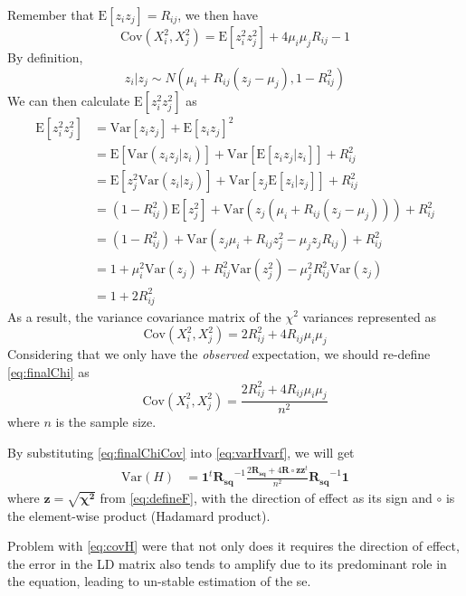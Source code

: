 			Remember that $\mathrm{E}[z_iz_j] = R_{ij}$, we then have
			$$
				\mathrm{Cov}(X_i^2, X_j^2)=\mathrm{E}[z_i^2z_j^2]+4\mu_i\mu_jR_{ij}-1
			$$
			By definition, 
			$$
				z_i|z_j\sim N(\mu_i+R_{ij}(z_j-\mu_j),1-R_{ij}^2)
			$$
			We can then calculate $\mathrm{E}[z_i^2z_j^2]$ as
			\begin{align*}
				\mathrm{E}[z_i^2z_j^2]&=\mathrm{Var}[z_iz_j]+\mathrm{E}[z_iz_j]^2\\
				&=\mathrm{E}[\mathrm{Var}(z_iz_j|z_i)]+\mathrm{Var}[\mathrm{E}[z_iz_j|z_i]]+R_{ij}^2\\
				&=\mathrm{E}[z_j^2\mathrm{Var}(z_i|z_j)]+\mathrm{Var}[z_j\mathrm{E}[z_i|z_j]]+R_{ij}^2\\
				&=(1-R_{ij}^2)\mathrm{E}[z_j^2]+\mathrm{Var}(z_j(\mu_i+R_{ij}(z_j-\mu_j)))+R_{ij}^2\\
				&=(1-R_{ij}^2)+\mathrm{Var}(z_j\mu_i+R_{ij}z_j^2-\mu_jz_jR_{ij})+R_{ij}^2\\
				&=1+\mu_i^2\mathrm{Var}(z_j)+R_{ij}^2\mathrm{Var}(z_j^2)-\mu_j^2R_{ij}^2\mathrm{Var}(z_j)\\
				&=1+2R_{ij}^2
			\end{align*}
			As a result, the variance covariance matrix of the $\chi^2$ variances represented as
			\begin{equation}
				\mathrm{Cov}(X_i^2,X_j^2) = 2R_{ij}^2+4R_{ij}\mu_i\mu_j
				\label{eq:finalChi}
			\end{equation}
			Considering that we only have the \emph{observed} expectation, we should re-define \cref{eq:finalChi} as
			\begin{equation}
				\mathrm{Cov}(X_i^2,X_j^2) = \frac{2R_{ij}^2+4R_{ij}\mu_i\mu_j}{n^2}
				\label{eq:finalChiCov}
			\end{equation}
			where $n$ is the sample size.
			
			By substituting \cref{eq:finalChiCov} into \cref{eq:varHvarf}, we will get
			\begin{align}
				\mathrm{Var}(H) &=\boldsymbol{1}^t\boldsymbol{R_{sq}}^{-1}\frac{2\boldsymbol{R_{sq}}+4\boldsymbol{R}\circ \boldsymbol{zz}^t}{n^2}\boldsymbol{R_{sq}}^{-1}\boldsymbol{1}
				\label{eq:covH}
			\end{align}
			where $\boldsymbol{z} = \sqrt{\boldsymbol{\chi^2}}$ from \cref{eq:defineF}, with the direction of effect as its sign and $\circ$ is the element-wise product (Hadamard product).
			 
			Problem with \cref{eq:covH} were that not only does it requires the direction of effect, the error in the \gls{LD} matrix also tends to amplify due to its predominant role in the equation, leading to un-stable estimation of the \gls{se}.
			 
